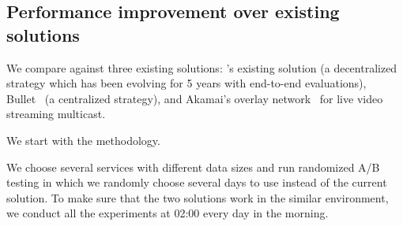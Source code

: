 

\subsection{Performance improvement over existing solutions}
\label{subsec:evaluation:centralized}

We compare \name against three existing solutions:
\company's existing solution (a decentralized strategy which has been evolving for 5 years with end-to-end evaluations),
Bullet~\cite{kostic2003bullet} (a centralized strategy), and
Akamai's overlay network~\cite{Andreev2013Designing} for live video streaming
multicast.


We start with the methodology.

 We choose several services with different data sizes and run randomized A/B testing in which
we randomly choose several days to use \name instead of the current solution. To make sure that the two solutions work in the similar environment, we conduct all the experiments at 02:00 every day in the morning.

